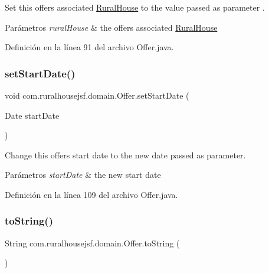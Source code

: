 Set this offers associated \mbox{\hyperlink{classcom_1_1ruralhousejsf_1_1domain_1_1_rural_house}{Rural\+House}} to the value passed as parameter . 


\begin{DoxyParams}{Parámetros}
{\em rural\+House} & the offers associated \mbox{\hyperlink{classcom_1_1ruralhousejsf_1_1domain_1_1_rural_house}{Rural\+House}} \\
\hline
\end{DoxyParams}


Definición en la línea 91 del archivo Offer.\+java.

\mbox{\label{classcom_1_1ruralhousejsf_1_1domain_1_1_offer_ad829c57ed6d018c673d4fff942757ed4}} 
\subsubsection{\texorpdfstring{setStartDate()}{setStartDate()}}
{\footnotesize\ttfamily void com.\+ruralhousejsf.\+domain.\+Offer.\+set\+Start\+Date (\begin{DoxyParamCaption}\item[{Date}]{start\+Date }\end{DoxyParamCaption})}



Change this offers start date to the new date passed as parameter. 


\begin{DoxyParams}{Parámetros}
{\em start\+Date} & the new start date \\
\hline
\end{DoxyParams}


Definición en la línea 109 del archivo Offer.\+java.

\mbox{\label{classcom_1_1ruralhousejsf_1_1domain_1_1_offer_a91920170708c786730b8707d51d5a810}} 
\subsubsection{\texorpdfstring{toString()}{toString()}}
{\footnotesize\ttfamily String com.\+ruralhousejsf.\+domain.\+Offer.\+to\+String (\begin{DoxyParamCaption}{ }\end{DoxyParamCaption})}



